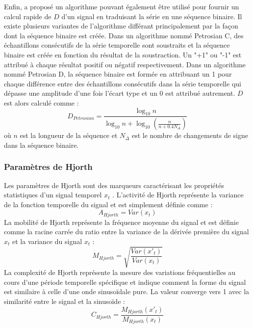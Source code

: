 Enfin, \cite{petrosian1995kolmogorov} a proposé un algorithme pouvant également être utilisé pour fournir un calcul rapide de $D$ d'un signal en traduisant la série en une séquence binaire. 
Il existe plusieurs variantes de l'algorithme différant principalement par la façon dont la séquence binaire est créée. 
Dans un algorithme nommé Petrosian C, des échantillons consécutifs de la série temporelle sont soustraits et la séquence binaire est créée en fonction du résultat de la soustraction. 
Un "+1" ou "-1" est attribué à chaque résultat positif ou négatif respectivement. 
Dans un algorithme nommé Petrosian D, la séquence binaire est formée en attribuant un 1 pour chaque différence entre des échantillons consécutifs dans la série temporelle qui dépasse une amplitude d'une fois l'écart type et un 0 est attribué autrement. 
$D$ est alors calculé comme :
\begin{equation}
D_{Petrosian} = \frac{\log_{10} n}{\log_{10} n + 
\log_{10} \left( \frac{n}{n+0.4N_\Delta} \right)}
\end{equation}
où $n$ est la longueur de la séquence et $N_\Delta$ est le nombre de changements de signe dans la séquence binaire. 

\subsubsection*{Paramètres de Hjorth}

Les paramètres de Hjorth sont des marqueurs caractérisant les propriétés statistiques d'un signal temporel $x_t$ \citep{hjorth1970eeg}. 
L'activité de Hjorth représente la variance de la fonction temporelle du signal et est simplement définie comme :
\begin{equation}
A_{Hjorth} = Var(x_t)
\end{equation}
La mobilité de Hjorth représente la fréquence moyenne du signal et est définie comme la racine carrée du ratio entre la variance de la dérivée première du signal $x_t$ et la variance du signal $x_t$ :
\begin{equation}
M_{Hjorth} = \sqrt{ \frac{Var(x'_t)}{Var(x_t)}}
\end{equation}
La complexité de Hjorth représente la mesure des variations fréquentielles au cours d'une période temporelle spécifique et indique comment la forme du signal est similaire à celle d'une onde sinusoïdale pure. 
La valeur converge vers 1 avec la similarité entre le signal et la sinusoïde : 
\begin{equation}
C_{Hjorth} = \frac{M_{Hjorth}(x'_t)}{M_{Hjorth}(x_t)}
\end{equation}

